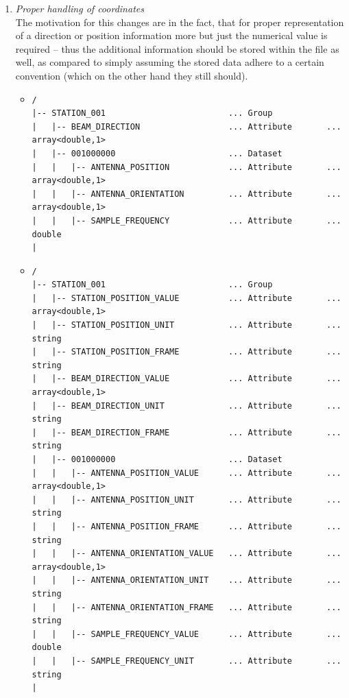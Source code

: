 \documentclass[a4paper,10pt,bibtotoc]{scrartcl}
\begin{document}
\begin{enumerate}
\begin{itemize}
{\begin{verbatim}
|   |
|   `
\end{verbatim}}
  \end{itemize}
\item \textit{Proper handling of coordinates} \\
    The motivation for this changes are in the fact, that for proper
    representation of a direction or position information more but just the
    numerical value is required -- thus the additional information should be
    stored within the file as well, as compared to simply assuming the stored
    data adhere to a certain convention (which on the other hand they still
    should).
  \begin{itemize}
  \item[\underline{old}:]
    {\small
\begin{verbatim}
/
|-- STATION_001                         ... Group
|   |-- BEAM_DIRECTION                  ... Attribute       ... array<double,1>
|   |-- 001000000                       ... Dataset
|   |   |-- ANTENNA_POSITION            ... Attribute       ... array<double,1>
|   |   |-- ANTENNA_ORIENTATION         ... Attribute       ... array<double,1>
|   |   |-- SAMPLE_FREQUENCY            ... Attribute       ... double
|
\end{verbatim}}
  \item[\underline{new}:]
    {\small
\begin{verbatim}
/
|-- STATION_001                         ... Group
|   |-- STATION_POSITION_VALUE          ... Attribute       ... array<double,1>
|   |-- STATION_POSITION_UNIT           ... Attribute       ... string
|   |-- STATION_POSITION_FRAME          ... Attribute       ... string
|   |-- BEAM_DIRECTION_VALUE            ... Attribute       ... array<double,1>
|   |-- BEAM_DIRECTION_UNIT             ... Attribute       ... string
|   |-- BEAM_DIRECTION_FRAME            ... Attribute       ... string
|   |-- 001000000                       ... Dataset
|   |   |-- ANTENNA_POSITION_VALUE      ... Attribute       ... array<double,1>
|   |   |-- ANTENNA_POSITION_UNIT       ... Attribute       ... string
|   |   |-- ANTENNA_POSITION_FRAME      ... Attribute       ... string
|   |   |-- ANTENNA_ORIENTATION_VALUE   ... Attribute       ... array<double,1>
|   |   |-- ANTENNA_ORIENTATION_UNIT    ... Attribute       ... string
|   |   |-- ANTENNA_ORIENTATION_FRAME   ... Attribute       ... string
|   |   |-- SAMPLE_FREQUENCY_VALUE      ... Attribute       ... double
|   |   |-- SAMPLE_FREQUENCY_UNIT       ... Attribute       ... string
|
\end{verbatim}}

\end{itemize}
\end{enumerate}
\end{document}
